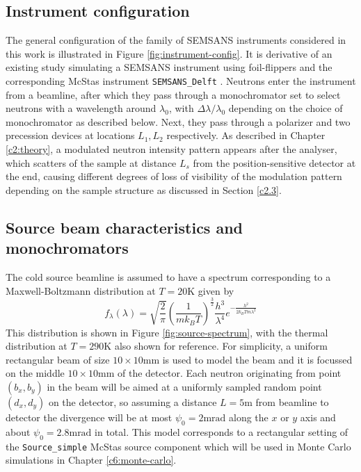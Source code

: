 \documentclass{article}
\begin{document}
\subsection{Instrument configuration}
\label{c3.1}
The general configuration of the family of SEMSANS instruments considered in this work is illustrated in Figure \ref{fig:instrument-config}. It is derivative of an existing study simulating a SEMSANS instrument using foil-flippers and the corresponding McStas instrument \texttt{SEMSANS\_Delft} \cite{bouwman2021b}. Neutrons enter the instrument from a beamline, after which they pass through a monochromator set to select neutrons with a wavelength around $\lambda_0$, with  $\Delta\lambda/\lambda_0$ depending on the choice of monochromator as described below. Next, they pass through a polarizer and two precession devices at locations $L_1, L_2$ respectively. As described in Chapter \ref{c2:theory}, a modulated neutron intensity pattern appears after the analyser, which scatters of the sample at distance $L_s$ from the position-sensitive detector at the end, causing different degrees of loss of visibility of the modulation pattern depending on the sample structure as discussed in Section \ref{c2.3}. 

\subsection{Source beam characteristics and monochromators}
\label{c3.2}
The cold source beamline is assumed to have a spectrum corresponding to a Maxwell-Boltzmann distribution at $T = 20 \unit{\kelvin}$ given by 
\begin{equation}
	f_\lambda(\lambda) = \sqrt{\frac{2}{\pi}}\left(\frac{1}{mk_BT}\right)^{\frac{3}{2}}\frac{h^3}{\lambda^4}e^{-\frac{h^2}{2k_BTm\lambda^2}} \label{eq:cold-source-spectrum}
\end{equation}
This distribution is shown in Figure \ref{fig:source-spectrum}, with the thermal distribution at $T=290 \unit{\kelvin}$ also shown for reference. For simplicity, a uniform rectangular beam of size $10\times10\unit{\milli\meter}$ is used to model the beam and it is focussed on the middle $10\times10\unit{\milli\meter}$ of the detector. Each neutron originating from point $(b_x,b_y)$ in the beam will be aimed at a uniformly sampled random point $(d_x, d_y)$ on the detector, so assuming a distance $L = 5\unit\meter$ from beamline to detector the divergence will be at most $\psi_0 = 2\unit{\milli\radian}$ along the $x$ or $y$ axis and about $\psi_0 = 2.8\unit{\milli\radian}$ in total. This model corresponds to a rectangular setting of the \texttt{Source\_simple} McStas source component which will be used in Monte Carlo simulations in Chapter \ref{c6:monte-carlo}.  
\end{document}
